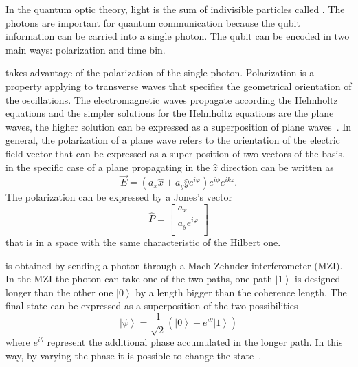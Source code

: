 In the quantum optic theory, light is the sum of indivisible particles called . The photons are important for quantum communication because the qubit information can be carried into a single photon. The qubit can be encoded in two main ways: polarization and time bin.

 takes advantage of the polarization of the single photon. Polarization is a property applying to transverse waves that specifies the geometrical orientation of the oscillations. The electromagnetic waves propagate according the Helmholtz equations and the simpler solutions for the Helmholtz equations are the plane waves, the higher solution can be expressed as a superposition of plane waves~\cite{a21}. In general, the polarization of a plane wave refers to the orientation of the electric field vector that can be expressed as a super position of two vectors of the basis, in the specific case of a plane propagating in the $\hat{z}$ direction can be written as
\begin{equation}
  \vec{E} = (a_x \hat{x} + a_y \hat{y} e^{i \varphi}) e^{i \phi} e^{i k z}.
\end{equation}
The polarization can be expressed by a Jones's vector
\begin{equation}
  \hat{P} = \begin{bmatrix} a_x \\ a_y e^{i\varphi} \\ \end{bmatrix}
\end{equation}
that is in a space with the same characteristic of the Hilbert one.

 is obtained by sending a photon through a Mach-Zehnder interferometer (MZI). In the MZI the photon can take one of the two paths, one path $\left|1\right>$ is designed longer than the other one $\left|0\right>$ by a length bigger than the coherence length. The final state can be expressed as a superposition of the two possibilities
\begin{equation}
  \left|\psi\right> = \frac{1}{\sqrt{2}} (\left|0\right> + e^{i\theta}\left|1\right>)
\end{equation}
where $e^{i \theta}$ represent the additional phase accumulated in the longer path. In this way, by varying the phase it is possible to change the state~\cite{a22}.

